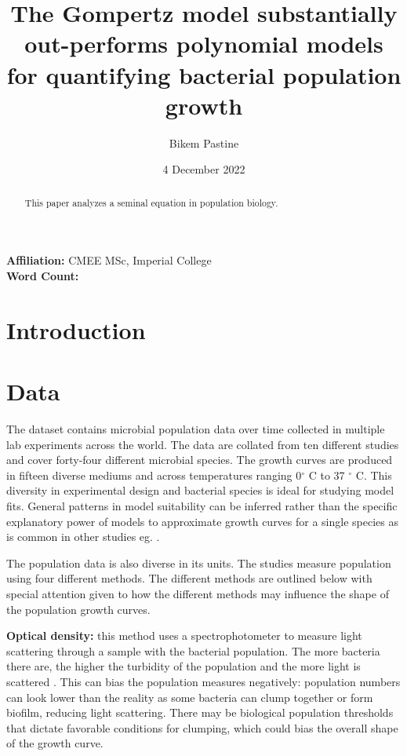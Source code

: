 \documentclass[11pt]{article}
\title{The Gompertz model substantially out-performs polynomial models for quantifying bacterial population growth}
\author{Bikem Pastine}
\date{4 December 2022}
\begin{document}
  \centering
  \maketitle
  
  \textbf{Affiliation:} CMEE MSc, Imperial College\\

  \textbf{Word Count:} 
  
   \newpage

  \begin{abstract}
    This paper analyzes a seminal equation in population biology.
  \end{abstract}

  \newpage

  \section{Introduction}
  \raggedright
  
  \section{Data}
  The dataset contains microbial population data over time collected in multiple lab experiments across the world.  The data are collated from ten different studies and cover forty-four different microbial species. The growth curves are produced in fifteen diverse mediums and across temperatures ranging 0$^{\circ}$ C to 37 $^{\circ}$ C. This diversity in experimental design and bacterial species is ideal for studying model fits. General patterns in model suitability can be inferred rather than the specific explanatory power of models to approximate growth curves for a single species as is common in other studies eg. \cite{Zwietering1990}.

  The population data is also diverse in its units. The studies measure population using four different methods. The different methods are outlined below with special attention given to how the different methods may influence the shape of the population growth curves.

  \textbf{Optical density:} this method uses a spectrophotometer to measure light scattering through a sample with the bacterial population. The more bacteria there are, the higher the turbidity of the population and the more light is scattered \cite{Madigan_Michael2021-07-01}. This can bias the population measures negatively: population numbers can look lower than the reality as some bacteria can clump together or form biofilm, reducing light scattering. There may be biological population thresholds that dictate favorable conditions for clumping, which could bias the overall shape of the growth curve. 
\end{document}
